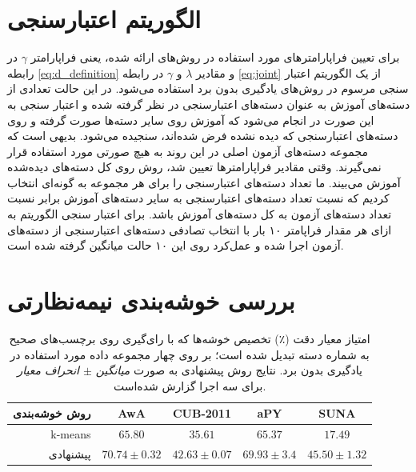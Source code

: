 \section{الگوریتم اعتبارسنجی}\label{exp:validation}
برای تعیین فراپارامترهای مورد استفاده در روش‌های ارائه شده، یعنی فراپارامتر $\gamma$ در رابطه \eqref{eq:d_definition} و مقادیر $\lambda$ و $\gamma$ در رابطه \eqref{eq:joint} از یک الگوریتم اعتبار سنجی مرسوم در روش‌های یادگیری بدون برد استفاده می‌شود.
در این حالت تعدادی از دسته‌های آموزش به عنوان دسته‌های اعتبارسنجی در نظر گرفته شده و اعتبار سنجی به این صورت در انجام می‌شود که آموزش روی سایر دسته‌ها صورت گرفته و روی دسته‌های اعتبارسنجی که دیده نشده فرض شده‌اند، سنجیده می‌شود. بدیهی است که مجموعه‌ دسته‌های آزمون اصلی در این روند به هیچ صورتی مورد استفاده قرار نمی‌گیرند. وقتی مقادیر فراپارامترها تعیین شد، روش روی کل دسته‌های دیده‌شده آموزش می‌بیند. ما تعداد دسته‌های اعتبارسنجی را برای هر مجموعه به گونه‌ای انتخاب کردیم که نسبت تعداد دسته‌های اعتبارسنجی به سایر دسته‌های آموزش برابر نسبت تعداد دسته‌های آزمون به کل دسته‌های آموزش باشد. برای اعتبار سنجی الگوریتم به ازای هر مقدار فراپامتر ۱۰ بار با انتخاب تصادفی دسته‌های اعتبارسنجی از دسته‌های آزمون اجرا شده و عمل‌کرد روی این ۱۰ حالت میانگین گرفته شده است.
%
\section{بررسی خوشه‌بندی نیمه‌نظارتی}\label{exp:cluster}
\begin{table}[ht]
\centering
\caption[بررسی عمل‌کرد خوشه‌بندی نیمه‌نظارتی پیشنهاتی]{
امتیاز معیار دقت (٪) تخصیص خوشه‌ها که با رای‌گیری روی برچسب‌های صحیح به شماره دسته تبدیل شده است؛ بر روی چهار مجموعه داده مورد استفاده در یادگیری بدون برد. نتایج روش پیشنهادی به صورت 
\textit{ میانگین $\pm$ انحراف معیار }
برای سه اجرا گزارش شده‌است.}
 \vspace{2mm} \label{tab:clustering}
\begin{tabular}{|r|c|c|c|c|}
\hline
روش خوشه‌بندی & AwA & CUB-2011 & aPY & SUNA \\
\hline
k-means                             &  ${65.80}$                 & ${35.61}$           & ${65.37 }$               & ${17.49 }$   \\
\hline
پیشنهادی                     & \textbf{${70.74\pm 0.32}$}  & \textbf{${42.63\pm 0.07}$} & \textbf{${69.93\pm 3.4}$} & \textbf{ ${45.50 \pm 1.32}$} \\
\hline
\end{tabular}
\vspace{2mm}
\end{table}

